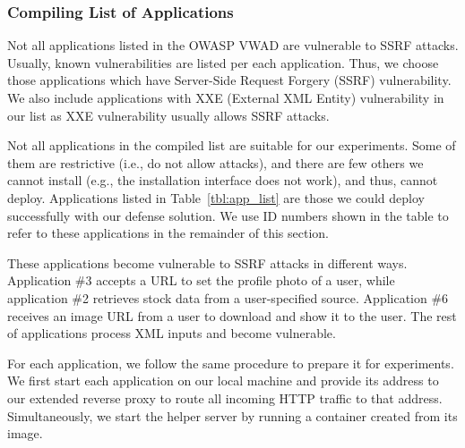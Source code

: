 \subsubsection{Compiling List of Applications}
Not all applications listed in the OWASP VWAD are vulnerable to SSRF attacks. Usually, known vulnerabilities are listed per each application. Thus, we choose those applications which have Server-Side Request Forgery (SSRF) vulnerability. We also include applications with XXE (External XML Entity) vulnerability in our list as XXE vulnerability usually allows SSRF attacks.

Not all applications in the compiled list are suitable for our experiments. Some of them are restrictive (i.e., do not allow attacks), and there are few others we cannot install (e.g., the installation interface does not work), and thus, cannot deploy. Applications listed in Table~\ref{tbl:app_list} are those we could deploy successfully with our defense solution. We use ID numbers shown in the table to refer to these applications in the remainder of this section.

These applications become vulnerable to SSRF attacks in different ways. Application \#3 accepts a URL to set the profile photo of a user, while application \#2 retrieves stock data from a user-specified source. Application \#6 receives an image URL from a user to download and show it to the user. The rest of applications process XML inputs and become vulnerable.

For each application, we follow the same procedure to prepare it for experiments. We first start each application on our local machine and provide its address to our extended reverse proxy to route all incoming HTTP traffic to that address. Simultaneously, we start the helper server by running a container created from its image.



